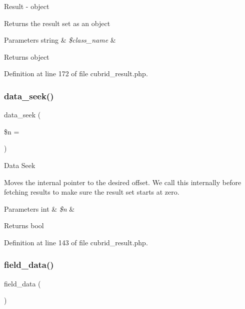 Result -\/ object

Returns the result set as an object


\begin{DoxyParams}[1]{Parameters}
string & {\em \$class\+\_\+name} & \\
\hline
\end{DoxyParams}
\begin{DoxyReturn}{Returns}
object 
\end{DoxyReturn}


Definition at line 172 of file cubrid\+\_\+result.\+php.

\mbox{\label{class_c_i___d_b__cubrid__result_a8255ae91816e4206e29eb7581c5af0f1}} 
\subsubsection{\texorpdfstring{data\_seek()}{data\_seek()}}
{\footnotesize\ttfamily data\+\_\+seek (\begin{DoxyParamCaption}\item[{}]{\$n = {} }\end{DoxyParamCaption})}

Data Seek

Moves the internal pointer to the desired offset. We call this internally before fetching results to make sure the result set starts at zero.


\begin{DoxyParams}[1]{Parameters}
int & {\em \$n} & \\
\hline
\end{DoxyParams}
\begin{DoxyReturn}{Returns}
bool 
\end{DoxyReturn}


Definition at line 143 of file cubrid\+\_\+result.\+php.

\mbox{\label{class_c_i___d_b__cubrid__result_a84bffd65e53902ade1591716749a33e3}} 
\subsubsection{\texorpdfstring{field\_data()}{field\_data()}}
{\footnotesize\ttfamily field\+\_\+data (\begin{DoxyParamCaption}{ }\end{DoxyParamCaption})}

